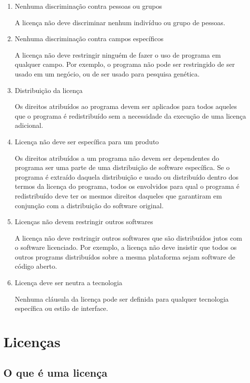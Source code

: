 \documentclass[12pt, a4paper]{report}
\begin{document}
\begin{enumerate}
  \item{Nenhuma discriminação contra pessoas ou grupos}

    A licença não deve discriminar nenhum indivíduo ou grupo de pessoas.

  \item{Nenhuma discriminação contra campos específicos}

    A licença não deve restringir ninguém de fazer o uso de programa em qualquer campo. Por exemplo, o programa não pode ser restringido de ser usado em um negócio, ou de ser usado para pesquisa genética.

  \item{Distribuição da licença}

    Os direitos atribuídos ao programa devem ser aplicados para todos aqueles que o programa é redistribuído sem a necessidade da execução de uma licença adicional.

  \item{Licença não deve ser específica para um produto}

    Os direitos atribuídos a um programa não devem ser dependentes do programa ser uma parte de uma distribuição de software específica. Se o programa é extraído daquela distribuição e usado ou distribuído dentro dos termos da licença do programa, todos os envolvidos para qual o programa é redistribuído deve ter os mesmos direitos daqueles que garantiram em conjunção com a distribuição do software original.

  \item{Licenças não devem restringir outros softwares}

    A licença não deve restringir outros softwares que são distribuídos jutos com o software licenciado. Por exemplo, a licença não deve insistir que todos os outros programs distribuídos sobre a mesma plataforma sejam software de código aberto.

  \item{Licença deve ser neutra a tecnologia}

      Nenhuma cláusula da licença pode ser definida para qualquer tecnologia específica ou estilo de interface.

\end{enumerate}

\chapter{Licenças}

\section{O que é uma licença}
\end{document}
